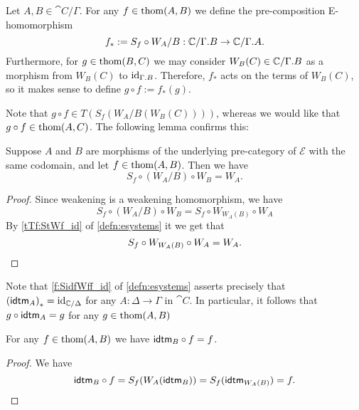 \begin{defn}
Let $A,B\in\cat{C}/\Gamma$.
For any $f\in\mathrm{thom}(A,B)$ we define the pre-composition E-homomorphism
\begin{equation*}
f_\ast := S_f\circ W_A/B : \cat{C}/\ctxext{\Gamma}{B}\to\cat{C}/\ctxext{\Gamma}{A}.
\end{equation*}
Furthermore, for $g\in\mathrm{thom}(B,C)$ we may consider $W_B(C)\in\cat{C}/\ctxext{\Gamma}{B}$ as a morphism from $W_B(C)$ to $\catid{\ctxext{\Gamma}{B}}$. Therefore, $f_\ast$ acts on the terms of
$W_B(C)$, so it makes sense to define $g\circ f:=f_\ast(g)$. 
\end{defn}

Note that $g\circ f\in T(S_f(W_A/B(W_B(C))))$, whereas we would like that
$g\circ f\in\mathrm{thom}(A,C)$. The following lemma confirms this:

\begin{lem}
Suppose $A$ and $B$ are morphisms of the underlying pre-category of $\mathcal{E}$
with the same codomain, and let $f\in\mathrm{thom}(A,B)$. Then we have 
\begin{equation*}
S_f\circ (W_A/B)\circ W_B=W_A.
\end{equation*}
\end{lem}

\begin{proof}
Since weakening is a weakening homomorphism, we have
\begin{equation*}
S_f\circ (W_A/B)\circ W_B=S_f\circ W_{W_A(B)}\circ W_A
\end{equation*}
By \autoref{tTf:StWf_id} of \autoref{defn:esystems} it we get that
\begin{equation*}
S_f\circ W_{W_A(B)}\circ W_A=W_A.\qedhere
\end{equation*}
\end{proof}

\begin{rmk}
Note that \autoref{f:SidfWff_id} of \autoref{defn:esystems} asserts precisely
that ${(\tfid{A})}_\ast=\catid{\cat{C}/\Delta}$ for any $A:\Delta\to \Gamma$ in $\cat{C}$. In
particular, it follows that $g\circ\tfid{A}=g$ for any $g\in\mathrm{thom}(A,B)$
\end{rmk}

\begin{lem}
For any $f\in\mathrm{thom}(A,B)$ we have $\tfid{B}\circ f=f$.
\end{lem}

\begin{proof}
We have
\begin{equation*}
\tfid{B}\circ f=S_f(W_A(\tfid{B}))=S_f(\tfid{W_A(B)})=f.\qedhere
\end{equation*}
\end{proof}

